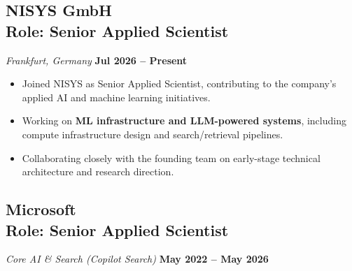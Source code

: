 \documentclass[11pt,letterpaper]{article}
\begin{document}
\subsection{NISYS GmbH \\ Role: Senior Applied Scientist}
\textit{Frankfurt, Germany} \hfill \textbf{Jul 2026 -- Present}

\begin{itemize}[leftmargin=*,noitemsep]
    \item Joined NISYS as Senior Applied Scientist, contributing to the company's applied AI and machine learning initiatives.
    \item Working on \textbf{ML infrastructure and LLM-powered systems}, including compute infrastructure design and search/retrieval pipelines.
    \item Collaborating closely with the founding team on early-stage technical architecture and research direction.
\end{itemize}

\subsection{Microsoft \\ Role: Senior Applied Scientist}
\textit{Core AI \& Search (Copilot Search)} \hfill \textbf{May 2022 -- May 2026}
\end{document}
